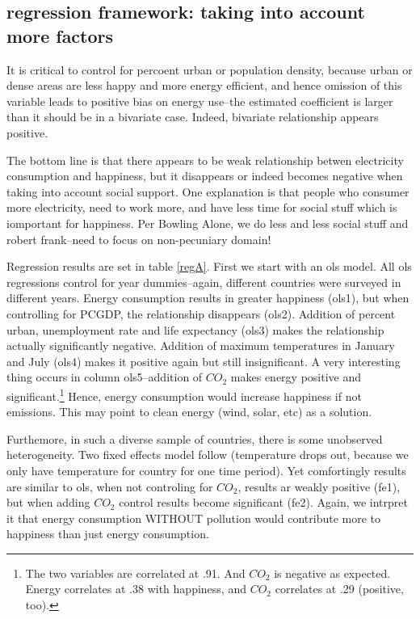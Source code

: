 \documentclass[10pt, letterpaper]{article}
\begin{document}
\begin{spacing}{1.4}


\subsection{regression framework: taking into account more factors} 

It is critical to control for percoent urban or population density, because
urban or dense areas are less happy and more energy efficient, and hence
omission of this variable leads to positive bias on energy use--the estimated
coefficient   is larger than it should be in a bivariate case. Indeed, bivariate
relationship appears positive. 

The bottom line is that there appears to be weak relationship betwen electricity
consumption and happiness, but it disappears or indeed becomes negative when
taking into account social support. One explanation is that people who consumer
more electricity, need to work more, and have less time for social stuff which
is iomportant for happiness. Per Bowling Alone, we do less and less social stuff
and robert frank--need to focus on non-pecuniary domain!

Regression results are set in table \ref{regA}. First we start with an ols
model. All ols regressions control for year dummies--again, different countries
were surveyed in different years. Energy consumption results in greater
happiness (ols1), but when controlling for PCGDP, the relationship disappears
(ols2). Addition of percent urban, unemployment rate and life expectancy (ols3)
makes the relationship actually significantly negative.  Addition of maximum
temperatures in January and July (ols4) makes it positive again but still
insignificant.  A very interesting thing occurs in column ols5--addition of
$CO_2$ makes energy positive and significant.\footnote{The two variables are
  correlated at .91. And $CO_2$ is negative as expected. Energy correlates at .38
  with happiness, and $CO_2$ correlates at .29 (positive, too).}
 Hence, energy consumption would increase happiness if not emissions. This may
 point to clean energy (wind, solar, etc) as a solution. 

Furthemore, in such a diverse sample of countries, there is some unobserved
heterogeneity. Two fixed effects model follow (temperature drops out, because we
 only have temperature for country for one time period). Yet comfortingly
 results are similar to ols, when not controling for $CO_2$, results ar weakly
 positive (fe1), but when adding $CO_2$ control results become significant
 (fe2). Again, we intrpret it  that energy consumption WITHOUT pollution would
 contribute more to happiness than just energy consumption.  


\end{spacing}
\end{document}
